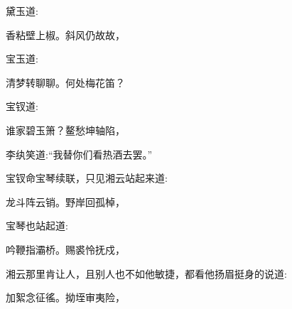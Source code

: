 \begin{parag}
    黛玉道:
\end{parag}


\begin{poem}
    \begin{pl} 香粘壁上椒。斜风仍故故，\end{pl}
\end{poem}


\begin{parag}
    宝玉道:
\end{parag}


\begin{poem}
    \begin{pl} 清梦转聊聊。何处梅花笛？\end{pl}
\end{poem}


\begin{parag}
    宝钗道:
\end{parag}


\begin{poem}
    \begin{pl} 谁家碧玉箫？鳌愁坤轴陷，\end{pl}
\end{poem}


\begin{parag}
    李纨笑道:“我替你们看热酒去罢。”
\end{parag}


\begin{parag}
    宝钗命宝琴续联，只见湘云站起来道:
\end{parag}


\begin{poem}
    \begin{pl} 龙斗阵云销。野岸回孤棹，\end{pl}
\end{poem}


\begin{parag}
    宝琴也站起道:
\end{parag}


\begin{poem}
    \begin{pl} 吟鞭指灞桥。赐裘怜抚戍，\end{pl}
\end{poem}


\begin{parag}
    湘云那里肯让人，且别人也不如他敏捷，都看他扬眉挺身的说道:
\end{parag}


\begin{poem}
    \begin{pl} 加絮念征徭。拗垤审夷险，\end{pl}
\end{poem}


